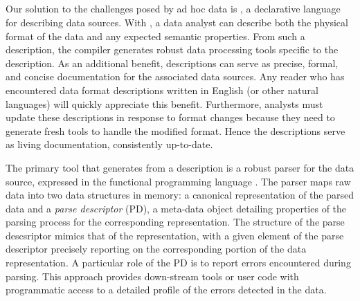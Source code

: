 
\subsection{\padsmlbig{}}

Our solution to the challenges posed by ad hoc data is \padsml{},
a declarative language for describing data sources. With \padsml{}, a
data analyst can describe both the physical format of the data and any
expected semantic properties. From such a description, the
\padsml{} compiler generates robust data
processing tools specific to the description. As an additional benefit, 
\padsml{} descriptions can serve as precise, formal, and concise
documentation for the associated data sources.  Any reader who has encountered
data format descriptions written in English (or other natural
languages) will quickly appreciate this benefit. Furthermore,
analysts must update these descriptions in response to format changes
because they need to generate fresh tools to handle the modified format.
Hence the descriptions serve as living documentation, consistently up-to-date.

The primary tool that \padsml{} generates from a
description is a robust parser for the data source, expressed in the
functional programming language \ocaml{}.  The parser maps raw data
into two data structures in memory: a canonical
representation of the parsed data and a \textit{parse descriptor}
(PD), a meta-data object detailing properties of the parsing process
for the corresponding representation. The structure of the parse
descsriptor mimics that of the representation, with a given element of
the parse descriptor precisely reporting on the corresponding portion
of the data representation. A particular role of the PD is to report
errors encountered during parsing.  This approach provides down-stream
tools or user code with programmatic access to a detailed profile of
the errors detected in the data.



